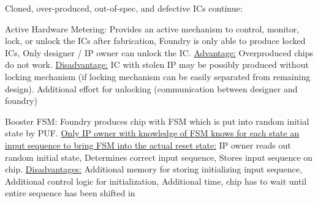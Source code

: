 \documentclass[landscape, a4paper]{article}
\begin{document}
\begin{minipage}[t]{0.2\linewidth}
	\begin{betterlist}
		\item \alert{Cloned, over-produced, out-of-spec, and defective ICs continue:}
		\begin{betterlist}
			\item \alert{Active Hardware Metering:} Provides an active mechanism to control, monitor, lock, or unlock the ICs after fabrication, Foundry is only able to produce locked ICs, Only designer / IP owner can unlock the IC. \underline{Advantage:} Overproduced chips do not work. \underline{Disadvantage:} IC with stolen IP may be possibly produced without locking mechanism (if locking mechanism can be easily separated from remaining design). Additional effort for unlocking (communication between designer and foundry)
			\begin{betterlist}
				\item \alert{Booster FSM:} Foundry produces chip with FSM which is put into \alert{random initial state} by PUF. \uline{Only IP owner with knowledge of FSM knows for each state an input sequence to bring FSM into the actual \alert{reset state}:} IP owner reads out random initial state, Determines correct input sequence, Stores input sequence on chip. \underline{Disadvantages:} Additional memory for storing initializing input sequence, Additional control logic for initialization, Additional time, chip has to wait until entire sequence has been shifted in


\end{betterlist}
\end{betterlist}
\end{betterlist}
\end{minipage}
\end{document}
